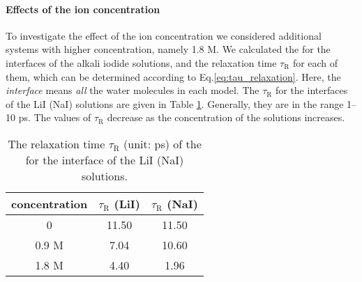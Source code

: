 
\FloatBarrier
\paragraph{Effects of the ion concentration}
To investigate the effect of the ion concentration we considered additional systems with higher concentration, namely 1.8 M.
We calculated the \CHB for the interfaces of the alkali iodide solutions, 
and the relaxation time $\tau_{\text{R}}$ for each of them, which can be determined according to Eq.\thinspace\ref{eq:tau_relaxation}. 
Here, the \emph{interface} means \emph{all} the water molecules in each model. 
The $\tau_{\text{R}}$ for the interfaces of the LiI (NaI) solutions are given in 
Table \ref{tab:tau_hb}. Generally, they are in the range 1--10 ps. 
The values of $\tau_{\text{R}}$ decrease as the concentration of the solutions increases.
\begin{table}[htbp]
\centering
\caption{\label{tab:tau_hb} 
  The relaxation time $\tau_{\text{R}}$ (unit: ps) of the \CHB  for the interface of the LiI (NaI) solutions.}
\begin{tabular}{ccc}
  concentration  & $\tau_{\text{R}}$ (LiI) & $\tau_{\text{R}}$ (NaI) \\
\hline
  0 & 11.50 & 11.50 \\
  0.9 M & 7.04 & 10.60 \\
  1.8 M & 4.40 & 1.96 
\end{tabular}
\end{table}

